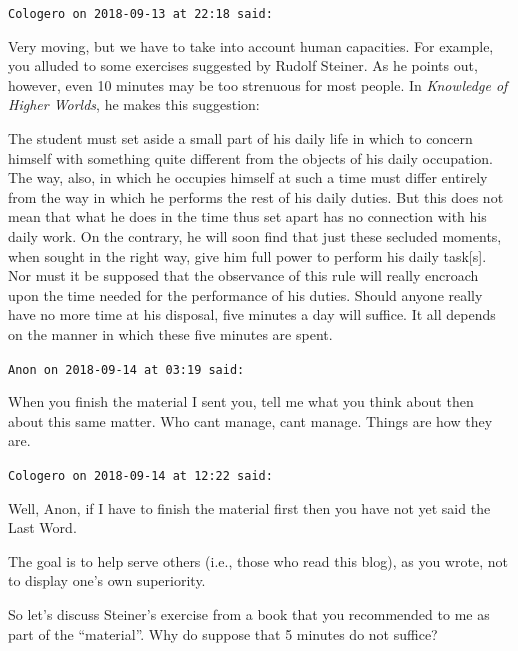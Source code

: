 \begin{footnotesize}\begin{sffamily}



\texttt{Cologero on 2018-09-13 at 22:18 said: }

Very moving, but we have to take into account human capacities. For example, you alluded to some exercises suggested by Rudolf Steiner. As he points out, however, even 10 minutes may be too strenuous for most people. In \emph{Knowledge of Higher Worlds}, he makes this suggestion:

\begin{quotex}\footnotesize
The student must set aside a small part of his daily life in which to concern himself with something quite different from the objects of his daily occupation. The way, also, in which he occupies himself at such a time must differ entirely from the way in which he performs the rest of his daily duties. But this does not mean that what he does in the time thus set apart has no connection with his daily work. On the contrary, he will soon find that just these secluded moments, when sought in the right way, give him full power to perform his daily task[s]. Nor must it be supposed that the observance of this rule will really encroach upon the time needed for the performance of his duties. Should anyone really have no more time at his disposal, five minutes a day will suffice. It all depends on the manner in which these five minutes are spent. 

\end{quotex}

\hfill

\texttt{Anon on 2018-09-14 at 03:19 said: }

When you finish the material I sent you, tell me what you think about then about this same matter. Who cant manage, cant manage. Things are how they are.


\hfill

\texttt{Cologero on 2018-09-14 at 12:22 said: }

Well, Anon, if I have to finish the material first then you have not yet said the Last Word.

The goal is to help serve others (i.e., those who read this blog), as you wrote, not to display one's own superiority.

So let's discuss Steiner's exercise from a book that you recommended to me as part of the “material”. Why do suppose that 5 minutes do not suffice?


\end{sffamily}
\end{footnotesize}
